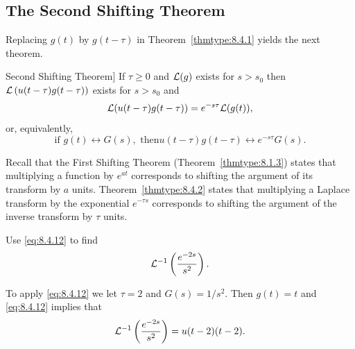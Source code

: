 \documentclass{ximera}
\begin{document}
\subsection*{The Second Shifting Theorem}

Replacing $g(t)$ by $g(t-\tau)$ in Theorem~\ref{thmtype:8.4.1}
yields the next theorem.

\begin{theorem}Second Shifting
Theorem]\label{thmtype:8.4.2} If
 $\tau\geq 0$ and ${\cal L}(g)$ exists for $s>s_0$
then  ${\cal L}\left(u(t-\tau)g(t-\tau)\right)$ exists for $s>s_0$ and
$$
{\cal L}(u(t-\tau)g(t-\tau))=e^{-s\tau}{\cal L}(g(t)),
$$
or, equivalently,
\begin{equation}\label{eq:8.4.12}
\mbox{if } g(t)\leftrightarrow G(s),\mbox{ then
}u(t-\tau)g(t-\tau)\leftrightarrow e^{-s\tau}G(s).
\end{equation}
\end{theorem}

\begin{remark}
Recall that the First Shifting Theorem
(Theorem~\ref{thmtype:8.1.3}) states that multiplying a function  by
$e^{at}$ corresponds to shifting the argument of its transform by $a$
units. Theorem~\ref{thmtype:8.4.2} states that multiplying a Laplace
transform by the exponential $e^{-\tau s}$ corresponds to shifting the
argument of the inverse transform by $\tau$ units.
\end{remark}

\begin{example}\label{example:8.4.6}
 Use \eqref{eq:8.4.12} to find
$$
{\cal L}^{-1}\left(\frac{e^{-2s}}{s^2}\right).
$$
\begin{explanation}
To apply \eqref{eq:8.4.12} we let
$\tau=2$ and $G(s)=1/s^2$. Then $g(t)=t$ and \eqref{eq:8.4.12} implies that
$$
{\cal L}^{-1}\left(\frac{e^{-2s}}{s^2}\right)=u(t-2)(t-2).
$$
\end{explanation}
\end{example}
\end{document}
